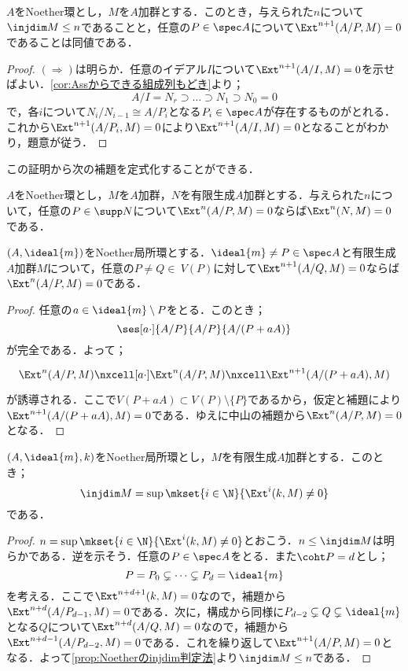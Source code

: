 \begin{prop}\label{prop:Noetherのinjdim判定法}
	$A$をNoether環とし，$M$を$A$加群とする．このとき，与えられた$n$について$\injdim M\leq n$であることと，任意の$P\in\spec A$について$\Ext^{n+1}(A/P,M)=0$であることは同値である．
\end{prop}

\begin{proof}
	$(\Longrightarrow)$は明らか．任意のイデアル$I$について$\Ext^{n+1}(A/I,M)=0$を示せばよい．\ref{cor:Assからできる組成列もどき}より；
	\[A/I=N_r\supset\dots\supset N_1\supset N_0=0\]
	で，各$i$について$N_{i}/N_{i-1}\cong A/P_i$となる$P_i\in\spec A$が存在するものがとれる．これから$\Ext^{n+1}(A/P_i,M)=0$により$\Ext^{n+1}(A/I,M)=0$となることがわかり，題意が従う．
\end{proof}

この証明から次の補題を定式化することができる．

\begin{lem}
	$A$をNoether環とし，$M$を$A$加群，$N$を有限生成$A$加群とする．与えられた$n$について，任意の$P\in\supp N$について$\Ext^n(A/P,M)=0$ならば$\Ext^n(N,M)=0$である．
\end{lem}

\begin{lem}\label{lem:Ext=0は落ちる}
	$(A,\ideal{m})$をNoether局所環とする．$\ideal{m}\neq P\in\spec A$と有限生成$A$加群$M$について，任意の$P\neq Q\in\ V(P)$に対して$\Ext^{n+1}(A/Q,M)=0$ならば$\Ext^n(A/P,M)=0$である．
\end{lem}

\begin{proof}
	任意の$a\in\ideal{m}\setminus P$をとる．このとき；
	\[\ses[a\cdot]{A/P}{A/P}{A/(P+aA)}\]
	が完全である．よって；
	\[\begin{tikzcd}
	\Ext^n(A/P,M)\nxcell[a\cdot]\Ext^n(A/P,M)\nxcell\Ext^{n+1}(A/(P+aA),M)
	\end{tikzcd}\]
	が誘導される．ここで$V(P+aA)\subset V(P)\setminus\{P\}$であるから，仮定と補題により$\Ext^{n+1}(A/(P+aA),M)=0$である．ゆえに中山の補題から$\Ext^n(A/P,M)=0$となる．
\end{proof}

\begin{thm}\label{thm:Noether局所環上の入射次元}
	$(A,\ideal{m},k)$をNoether局所環とし，$M$を有限生成$A$加群とする．このとき；
	\[\injdim M=\sup\mkset{i\in\N}{\Ext^i(k,M)\neq0}\]
	である．
\end{thm}

\begin{proof}
	$n=\sup\mkset{i\in\N}{\Ext^i(k,M)\neq0}$とおこう．$n\leq\injdim M$は明らかである．逆を示そう．任意の$P\in\spec A$をとる．また$\coht P=d$とし；
	\[P=P_0\subsetneq\cdots\subsetneq P_d=\ideal{m}\]
	を考える．ここで$\Ext^{n+d+1}(k,M)=0$なので，補題から$\Ext^{n+d}(A/P_{d-1},M)=0$である．次に，構成から同様に$P_{d-2}\subsetneq Q\subsetneq \ideal{m}$となる$Q$について$\Ext^{n+d}(A/Q,M)=0$なので，補題から$\Ext^{n+d-1}(A/P_{d-2},M)=0$である．これを繰り返して$\Ext^{n+1}(A/P,M)=0$となる．よって\ref{prop:Noetherのinjdim判定法}より$\injdim M\leq n$である．
\end{proof}

